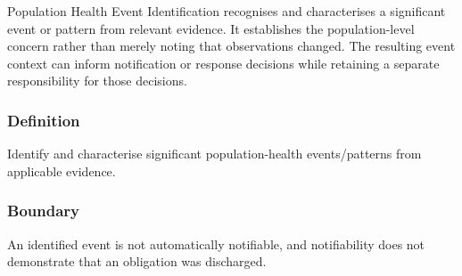 Population Health Event Identification recognises and characterises a significant event or pattern from relevant evidence. It establishes the population-level concern rather than merely noting that observations changed. The resulting event context can inform notification or response decisions while retaining a separate responsibility for those decisions.

\subsubsection*{Definition}

Identify and characterise significant population-health events/\allowbreak{}patterns from applicable evidence.

\subsubsection*{Boundary}

An identified event is not automatically notifiable, and notifiability does not demonstrate that an obligation was discharged.

